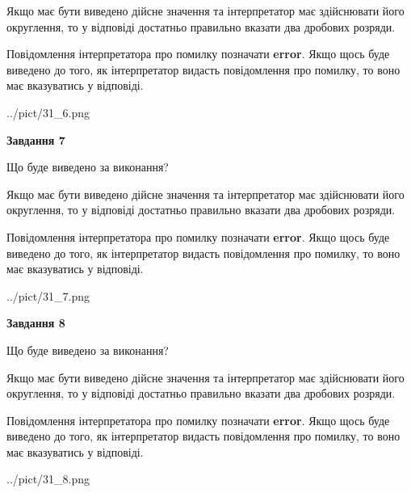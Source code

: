 \documentclass[12pt, ukrainian]{article}
\begin{document}
{\begin {Large}
Якщо має бути виведено дійсне значення та інтерпретатор має здійснювати його округлення, 
то у відповіді достатньо правильно вказати два дробових розряди.

Повідомлення інтерпретатора про помилку позначати \textbf{error}.
Якщо щось буде виведено до того, як інтерпретатор видасть повідомлення про помилку, 
то воно має вказуватись у відповіді. \par

\begin{center}
	{../pict/31_6.png}
\end{center}
\newpage

{\begin {center}\textbf{Завдання 7}\end {center}}\par
Що буде виведено за виконання? \par

Якщо має бути виведено дійсне значення та інтерпретатор має здійснювати його округлення, 
то у відповіді достатньо правильно вказати два дробових розряди.

Повідомлення інтерпретатора про помилку позначати \textbf{error}.
Якщо щось буде виведено до того, як інтерпретатор видасть повідомлення про помилку, 
то воно має вказуватись у відповіді. \par

\begin{center}
	{../pict/31_7.png}
\end{center}
\newpage

{\begin {center}\textbf{Завдання 8}\end {center}}\par
Що буде виведено за виконання? \par

Якщо має бути виведено дійсне значення та інтерпретатор має здійснювати його округлення, 
то у відповіді достатньо правильно вказати два дробових розряди.

Повідомлення інтерпретатора про помилку позначати \textbf{error}.
Якщо щось буде виведено до того, як інтерпретатор видасть повідомлення про помилку, 
то воно має вказуватись у відповіді. \par

\begin{center}
	{../pict/31_8.png}
\end{center}
\newpage


\end{Large}}
\end{document}
